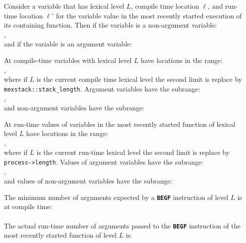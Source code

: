 \documentclass[12pt]{article}
\newcommand{\TT}[1]{{\tt \bfseries #1}}
\newcommand{\EOL}{\penalty \exhyphenpenalty}
\newenvironment{indpar}[1][0.3in]%
	{\begin{list}{}%
		     {\setlength{\itemsep}{0in}%
		      \setlength{\topsep}{0in}%
		      \setlength{\parsep}{1ex}%
		      \setlength{\labelwidth}{#1}%
		      \setlength{\leftmargin}{#1}%
		      \addtolength{\leftmargin}{\labelsep}}%
	 \item}%
	{\end{list}}
\begin{document}
\begin{indpar}
Consider a variable that has lexical level $L$,
compile time location $\ell$,
and run-time location $\ell'$ for the variable value in the most recently
started execution of its containing function.
Then if the variable is a non-argument variable:\label{FP} \\
\hspace*{1in}{\tt $\ell$ - mexstack::fp[$L$] == $\ell'$ - process->fp[$L$]}, \\
and if the variable is an argument variable:\label{AP} \\
\hspace*{1in}{\tt $\ell$ - mexstack::ap[$L$] == $\ell'$ - process->ap[$L$]}

At compile-time variables with lexical level $L$ have locations in
the range:\label{LP} \\
\hspace*{1in}{\tt [ mexstack::ap[$L$], mexstack::ap[$L$+1] )}, \\
where if $L$ is the current compile time lexical level the second
limit is replace by {\tt mexstack::stack\_length}.
Argument variables have the subrange: \\
\hspace*{1in}{\tt [ mexstack::ap[$L$], mexstack::fp[$L$] )}, \\
and non-argument variables have the subrange: \\
\hspace*{1in}{\tt [ mexstack::fp[$L$], mexstack::ap[$L$+1] )}

At run-time values of variables in the most recently started
function of lexical level $L$ have locations in
the range: \\
\hspace*{1in}{\tt [ process->ap[$L$], process->ap[$L$+1] )}, \\
where if $L$ is the current run-time lexical level the second
limit is replace by {\tt process->\EOL length}.
Values of argument variables have the subrange: \\
\hspace*{1in}{\tt [ process->ap[$L$], process->fp[$L$] )}, \\
and values of non-argument variables have the subrange: \\
\hspace*{1in}{\tt [ process->fp[$L$], process->ap[$L$+1] )}

The minimum number of arguments expected by a \TT{BEGF} instruction
of level $L$
is at compile time: \\
\hspace*{1in}{\tt mexstack::ap[$L$] - mexstack::fp[$L$]} \\
The actual run-time  number of arguments passed to the \TT{BEGF} instruction
of the most recently started function of level $L$
is: \\
\hspace*{1in}{\tt process->ap[$L$] - process->fp[$L$]}

\end{indpar}
\end{document}
